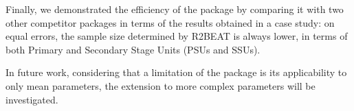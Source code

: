 Finally, we demonstrated the efficiency of the package by comparing it with two other competitor packages in terms of the results obtained in a case study: on equal errors, the sample size determined by R2BEAT is always lower,
in terms of both Primary and Secondary Stage Units (PSUs and SSUs).

In future work, considering that a limitation of the package is its applicability to only mean parameters, the
extension to more complex parameters will be investigated.




\address{Giulio Barcaroli\\
  Independent consultant\\
  via Monte delle Gioie 29 - 00199 Roma\\
  Italy\\
  }

\address{Andrea Fasulo\\
  Italian National Institute of Statistics\\
  via Cesare Balbo 16 - 00184 Roma\\
  Italy\\
  }

\address{Alessio Guandalini\\
  Italian National Institute of Statistics\\
  via Cesare Balbo 16 - 00184 Roma\\
  Italy\\
  }

\address{Marco D. Terribili\\
	Italian National Institute of Statistics\\
	via Cesare Balbo 16 - 00184 Roma\\
	Italy\\
	}
